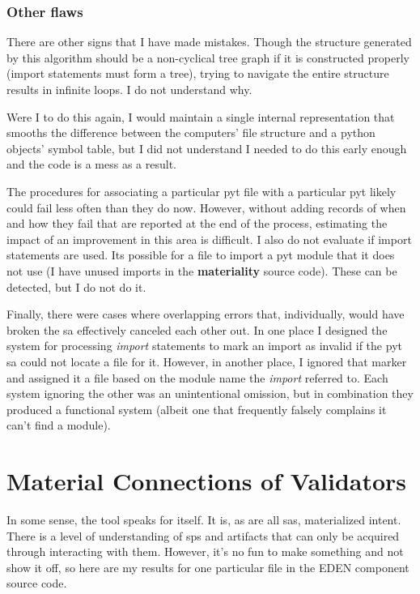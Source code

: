 \documentclass[a4paper,man,natbib,floatsintext]{apa6}
\begin{document}
  \subsubsection{Other flaws}
  There are other signs that I have made mistakes. Though the structure generated by this algorithm should be a non-cyclical tree graph if it is constructed properly (import statements must form a tree), trying to navigate the entire structure results in infinite loops. I do not understand why. 

  Were I to do this again, I would maintain a single internal representation that smooths the difference between the computers' file structure and a python objects' symbol table, but I did not understand I needed to do this early enough and the code is a mess as a result. 

  The procedures for associating a particular \Gls{pyt} file with a particular \Gls{pyt} likely could fail less often than they do now. However, without adding records of when and how they fail that are reported at the end of the process, estimating the impact of an improvement in this area is difficult. I also do not evaluate if import statements are used. Its possible for a file to import a \Gls{pyt} module that it does not use (I have unused imports in the \textbf{materiality} source code). These can be detected, but I do not do it.

  Finally, there were cases where overlapping errors that, individually, would have broken the \gls{sa} effectively canceled each other out. In one place I designed the system for processing \textit{import} statements to mark an import as invalid if the \Gls{pyt} \gls{sa} could not locate a file for it. However, in another place, I ignored that marker and assigned it a file based on the module name the \textit{import} referred to. Each system ignoring the other was an unintentional omission, but in combination they produced a functional system (albeit one that frequently falsely complains it can't find a module).

  \section{Material Connections of Validators}
  In some sense, the tool speaks for itself. It is, as are all \glspl{sa}, materialized intent. There is a level of understanding of \glspl{sp} and artifacts that can only be acquired through interacting with them. However, it's no fun to make something and not show it off, so here are my results for one particular file in the \gls{EDEN} component source code.
\end{document}
